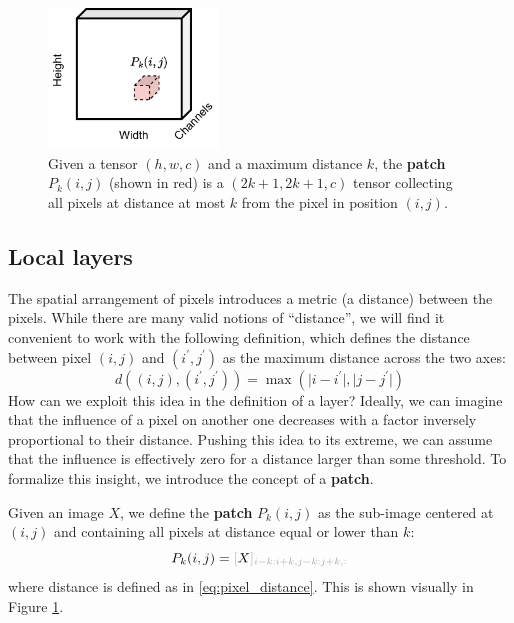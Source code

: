 \begin{figure}
    \centering
    \hspace{1em}\includegraphics[width=0.4\textwidth]{images/patch}
    \caption{Given a tensor $(h,w,c)$ and a maximum distance $k$, the \textbf{patch} $P_k(i,j)$ (shown in red) is a $(2k+1,2k+1,c)$ tensor collecting all pixels at distance at most $k$ from the pixel in position $(i,j)$.}
    \label{fig:patch}
\end{figure}

\subsection{Local layers}

The spatial arrangement of pixels introduces a metric (a distance) between the pixels. While there are many valid notions of “distance”, we will find it convenient to work with the following definition, which defines the distance between pixel $(i,j)$ and $(i^\prime, j^\prime)$ as the maximum distance across the two axes:
%
\begin{equation}
d((i,j), (i^\prime,j^\prime))=\max(\lvert i-i^\prime \rvert,\lvert j-j^\prime\rvert)
\label{eq:pixel_distance}
\end{equation}
%
How can we exploit this idea in the definition of a layer? Ideally, we can imagine that the influence of a pixel on another one decreases with a factor inversely proportional to their distance. Pushing this idea to its extreme, we can assume that the influence is effectively zero for a distance larger than some threshold. To formalize this insight, we introduce the concept of a \textbf{patch}.

\begin{definition} \addbottle
Given an image $X$, we define the \textbf{patch} $P_{k}(i,j)$ as the sub-image centered at $(i,j)$ and containing all pixels at distance equal or lower than $k$:
%
$$
P_{k}(i,j) = \idx{X}{i-k:i+k,j-k:j+k,:}
$$
%
where distance is defined as in \eqref{eq:pixel_distance}. This is shown visually in Figure \ref{fig:patch}.
%
\end{definition}



